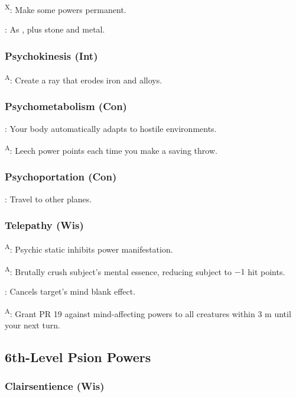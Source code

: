 \textsuperscript{X}: Make some powers permanent.

: As , plus stone and metal.


\subsubsection{Psychokinesis (Int)}

\textsuperscript{A}: Create a ray that erodes iron and alloys.


\subsubsection{Psychometabolism (Con)}

: Your body automatically adapts to hostile environments.

\textsuperscript{A}: Leech power points each time you make a saving throw.


\subsubsection{Psychoportation (Con)}

: Travel to other planes.


\subsubsection{Telepathy (Wis)}

\textsuperscript{A}: Psychic static inhibits power manifestation.

\textsuperscript{A}: Brutally crush subject's mental essence, reducing subject to $-1$ hit points.

: Cancels target's mind blank effect.

\textsuperscript{A}: Grant PR 19 against mind-affecting powers to all creatures within 3 m until your next turn.



\subsection{6th-Level Psion Powers}


\subsubsection{Clairsentience (Wis)}

